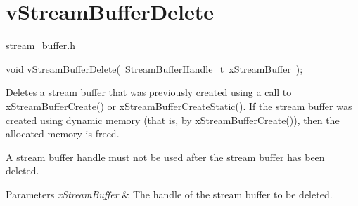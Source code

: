\hypertarget{group__v_stream_buffer_delete}{}\section{v\+Stream\+Buffer\+Delete}
\label{group__v_stream_buffer_delete}
\mbox{\hyperlink{stream__buffer_8h}{stream\+\_\+buffer.\+h}}


\begin{DoxyPre}
void \mbox{\hyperlink{stream__buffer_8h_a05dc9d2ae220a050526a062eddf6d7a2}{vStreamBufferDelete( StreamBufferHandle\_t xStreamBuffer )}};
\end{DoxyPre}


Deletes a stream buffer that was previously created using a call to \mbox{\hyperlink{stream__buffer_8h_a39aa4dd8b83e2df7ded291f863fb5fed}{x\+Stream\+Buffer\+Create()}} or \mbox{\hyperlink{stream__buffer_8h_a3c248575ac1b83801db605b32a118f77}{x\+Stream\+Buffer\+Create\+Static()}}. If the stream buffer was created using dynamic memory (that is, by \mbox{\hyperlink{stream__buffer_8h_a39aa4dd8b83e2df7ded291f863fb5fed}{x\+Stream\+Buffer\+Create()}}), then the allocated memory is freed.

A stream buffer handle must not be used after the stream buffer has been deleted.


\begin{DoxyParams}{Parameters}
{\em x\+Stream\+Buffer} & The handle of the stream buffer to be deleted. \\
\hline
\end{DoxyParams}
